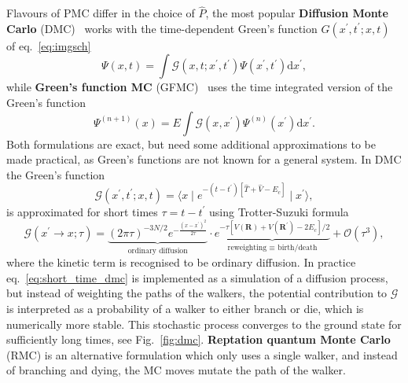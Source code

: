 Flavours of PMC differ in the choice of $\hat{P}$, the most popular \textbf{Diffusion Monte Carlo} (DMC)~\cite{foulkes2001quantum, reynolds1990diffusion} works with the time-dependent Green's function $G(x^\prime, t^\prime; x, t)$ of eq.~\eqref{eq:imgsch}
\begin{equation}
	\Psi(x, t)=\int \mathcal G\left(x, t; x^\prime, t^\prime\right) \Psi \left(x^{\prime}, t^\prime \right) \mathrm{d} x^{\prime},
\end{equation}
while\textbf{ Green's function MC} (GFMC)~\cite{kalos1962monte, kalos1966stochastic} uses the time integrated version of the Green's function
\begin{equation}
	\Psi^{(n+1)}(x)=E \int \mathcal G\left(x, x^{\prime}\right) \Psi^{(n)}\left(x^{\prime}\right) \mathrm{d}x^\prime. 
\end{equation}
Both formulations are exact, but need some additional approximations to be made practical, as Green's functions are not known for a general system. In DMC the Green's function
\begin{equation}
	\mathcal G(x^\prime, t^\prime; x, t) = \langle x \mid e^{-(t-t^\prime) [\hat T + \hat V - E_c ] } \mid x^\prime \rangle,
\end{equation}
is approximated for short times $\tau = t-t^\prime$ using Trotter-Suzuki formula
\begin{equation}
	\label{eq:short_time_dmc}
	\mathcal G(x^\prime \rightarrow x; \tau) = \underbrace{(2 \pi \tau)^{-3N / 2} e^{-\frac{\left(x-x^{\prime}\right)^{2}}{2 \tau}}}_{\text{ordinary diffusion}} \cdot \underbrace{e^{-\tau\left[V(\mathbf{R})+V\left(\mathbf{R}^{\prime}\right)-2 E_{c}\right] / 2}}_{\text{reweighting $\equiv$ birth/death}} + \mathcal{O}(\tau^3),
\end{equation}
where the kinetic term is recognised to be ordinary diffusion. In practice eq.~\eqref{eq:short_time_dmc} is implemented as a simulation of a diffusion process, but instead of weighting the paths of the walkers, the potential contribution to $\mathcal G$ is interpreted as a probability of a walker to either branch or die, which is numerically more stable. This stochastic process converges to the ground state for sufficiently long times, see Fig.~\ref{fig:dmc}. \textbf{Reptation quantum Monte Carlo}~\cite{reynolds1990diffusion} (RMC) is an alternative formulation which only uses a single walker, and instead of branching and dying, the MC moves mutate the path of the walker. 
